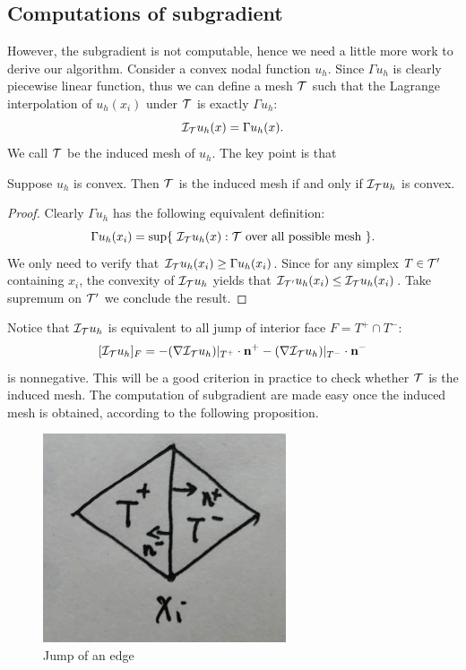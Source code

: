 \documentclass{article}
\begin{document}
\subsection{Computations of subgradient}
However, the subgradient is not computable, hence we need a little more work to derive our algorithm. Consider a convex nodal function $u_h$. Since $\Gamma u_h$ is clearly piecewise linear function, thus we can define a mesh $\mathcal T$ such that the Lagrange interpolation of $u_h(x_i)$ under $\mathcal T$ is exactly $\Gamma u_h$:
$$\mathcal I_{\mathcal T}u_h(x) = \Gamma u_h(x).$$
We call $\mathcal T$ be the induced mesh of $u_h$. The key point is that 
\begin{proposition}
	Suppose $u_h$ is convex. Then $\mathcal T$ is the induced mesh if and only if $\mathcal I_{\mathcal T}u_h$ is convex.
\end{proposition}
\begin{proof}
	Clearly $\Gamma u_h$ has the following equivalent definition:
	$$\Gamma u_h(x_i) =  \sup\{~\mathcal I_{\mathcal T}u_h(x): \mathcal T \text{ over all possible mesh }\}.$$
	We only need to verify that $\mathcal I_{\mathcal T}u_h(x_i) \ge \Gamma u_h(x_i)$. Since for any simplex $T \in \mathcal T'$ containing $x_i$, the convexity of $\mathcal I_{\mathcal T}u_h$ yields that $\mathcal I_{\mathcal T'}u_h(x_i) \le \mathcal I_{\mathcal T}u_h(x_i)$. Take supremum on $\mathcal T'$ we conclude the result.
\end{proof}
Notice that $\mathcal I_{\mathcal T}u_h$ is equivalent to all jump of interior face $F = T^+ \cap T^-$:
$$[\mathcal I_{\mathcal T}u_h]_F = -(\nabla \mathcal I_{\mathcal T}u_h)|_{T^+}\cdot \textbf{n}^+ -(\nabla \mathcal I_{\mathcal T}u_h)|_{T^-}\cdot \textbf{n}^-$$
is nonnegative. This will be a good criterion in practice to check whether $\mathcal T$ is the induced mesh. The computation of subgradient are made easy once the induced mesh is obtained, according to the following proposition.
\begin{figure}[H]
	
	
	\centering
	\includegraphics[scale=0.4]{../fig/jump.png}
	\caption{Jump of an edge}
	\label{fig:jump}
\end{figure}
\end{document}

